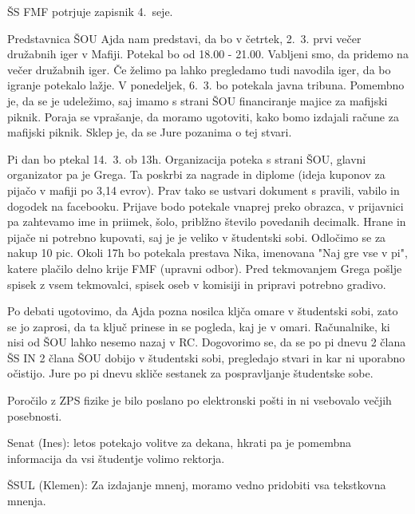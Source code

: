 \documentclass{seja}
\begin{document}
\begin{ad}
\item
\begin{sklep*}
  ŠS FMF potrjuje zapisnik 4.~seje.
\end{sklep*}

\item
Predstavnica ŠOU Ajda nam predstavi, da bo v četrtek, 2.\ 3. prvi večer družabnih iger v Mafiji. Potekal bo od 18.00 - 21.00. Vabljeni smo, da pridemo na večer družabnih iger. Če želimo pa lahko pregledamo tudi navodila iger, da bo igranje potekalo lažje.
V ponedeljek, 6.\ 3. bo potekala javna tribuna. Pomembno je, da se je udeležimo, saj imamo s strani ŠOU financiranje majice za mafijski piknik.
Poraja se vprašanje, da moramo ugotoviti, kako bomo izdajali račune za mafijski piknik. Sklep je, da se Jure pozanima o tej stvari.

\item
Pi dan bo ptekal 14.\ 3. ob 13h. Organizacija poteka s strani ŠOU, glavni organizator pa je Grega. Ta poskrbi za nagrade in diplome (ideja kuponov za pijačo v mafiji po 3,14 evrov). Prav tako se ustvari dokument s pravili, vabilo in dogodek na facebooku. Prijave bodo potekale vnaprej preko obrazca, v prijavnici pa zahtevamo ime in priimek, šolo, priblžno število povedanih decimalk.
Hrane in pijače ni potrebno kupovati, saj je je veliko v študentski sobi. Odločimo se za nakup 10 pic.
Okoli 17h bo potekala prestava Nika, imenovana "Naj gre vse v pi", katere plačilo delno krije FMF (upravni odbor).
Pred tekmovanjem Grega pošlje spisek z vsem tekmovalci, spisek oseb v komisiji in pripravi potrebno gradivo.

\item
Po debati ugotovimo, da Ajda pozna nosilca kljča omare v študentski sobi, zato se jo zaprosi, da ta ključ prinese in se pogleda, kaj je v omari. Računalnike, ki nisi od ŠOU lahko nesemo nazaj v RC.
Dogovorimo se, da se po pi dnevu 2 člana ŠS IN 2 člana ŠOU dobijo v študentski sobi, pregledajo stvari in kar ni uporabno očistijo.
Jure po pi dnevu skliče sestanek za pospravljanje študentske sobe.

\item
Poročilo z ZPS fizike je bilo poslano po elektronski pošti in ni vsebovalo večjih posebnosti.

Senat (Ines): letos potekajo volitve za dekana, hkrati pa je pomembna informacija da vsi študentje volimo rektorja.

ŠSUL (Klemen): Za izdajanje mnenj, moramo vedno pridobiti vsa tekstkovna mnenja.


\end{ad}
\end{document}
